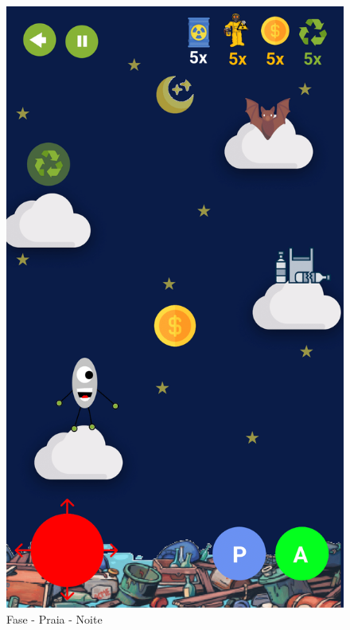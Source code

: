 \documentclass[]{scrartcl}
\begin{document}
\begin{figure}[H]
	\begin{center}
		\includegraphics[scale=0.3]{figs/Game Design-14.png}
		\caption{Fase - Praia - Noite}
	\end{center}
\end{figure}
\end{document}
